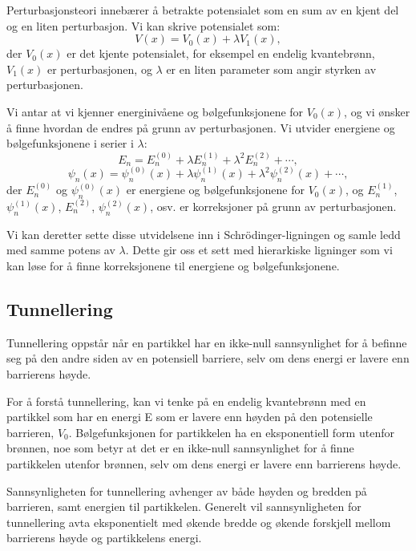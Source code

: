 Perturbasjonsteori innebærer å betrakte potensialet som en sum av en kjent del og en liten perturbasjon. Vi kan skrive potensialet som:
\begin{equation*}
V(x) = V_0(x) + \lambda V_1(x),
\end{equation*}
der $V_0(x)$ er det kjente potensialet, for eksempel en endelig kvantebrønn, $V_1(x)$ er perturbasjonen, og $\lambda$ er en liten parameter som angir styrken av perturbasjonen.

Vi antar at vi kjenner energinivåene og bølgefunksjonene for $V_0(x)$, og vi ønsker å finne hvordan de endres på grunn av perturbasjonen. Vi utvider energiene og bølgefunksjonene i serier i $\lambda$:
\begin{equation*}
E_n = E_n^{(0)} + \lambda E_n^{(1)} + \lambda^2 E_n^{(2)} + \cdots,
\end{equation*}
\begin{equation*}
\psi_n(x) = \psi_n^{(0)}(x) + \lambda \psi_n^{(1)}(x) + \lambda^2 \psi_n^{(2)}(x) + \cdots,
\end{equation*}
der $E_n^{(0)}$ og $\psi_n^{(0)}(x)$ er energiene og bølgefunksjonene for $V_0(x)$, og $E_n^{(1)}$, $\psi_n^{(1)}(x)$, $E_n^{(2)}$, $\psi_n^{(2)}(x)$, osv. er korreksjoner på grunn av perturbasjonen.

Vi kan deretter sette disse utvidelsene inn i Schrödinger-ligningen og samle ledd med samme potens av $\lambda$. Dette gir oss et sett med hierarkiske ligninger som vi kan løse for å finne korreksjonene til energiene og bølgefunksjonene.

\subsection*{Tunnellering}
Tunnellering oppstår når en partikkel har en ikke-null sannsynlighet for å befinne seg på den andre siden av en potensiell barriere, selv om dens energi er lavere enn barrierens høyde.

For å forstå tunnellering, kan vi tenke på en endelig kvantebrønn med en partikkel som har en energi E som er lavere enn høyden på den potensielle barrieren, $V_0$. Bølgefunksjonen for partikkelen ha en eksponentiell form utenfor brønnen, noe som betyr at det er en ikke-null sannsynlighet for å finne partikkelen utenfor brønnen, selv om dens energi er lavere enn barrierens høyde.

Sannsynligheten for tunnellering avhenger av både høyden og bredden på barrieren, samt energien til partikkelen. Generelt vil sannsynligheten for tunnellering avta eksponentielt med økende bredde og økende forskjell mellom barrierens høyde og partikkelens energi.

